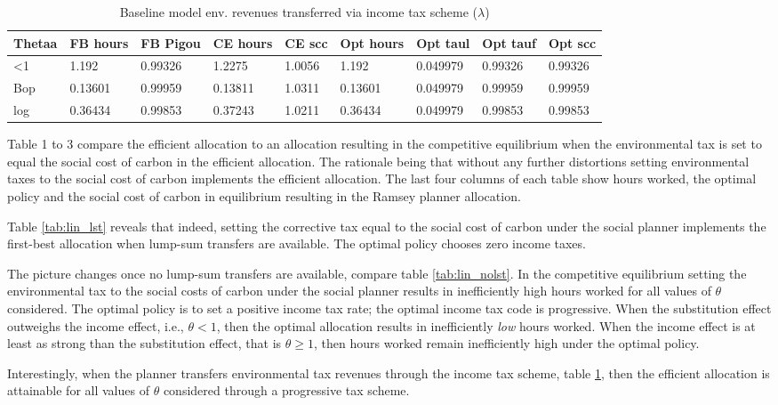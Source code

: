 \begin{table}[h!!]
	\caption{Baseline model env. revenues transferred via income tax scheme ($\lambda$)}\label{tab:base}
	\begin{tabular}{lllllllll}
		Thetaa & FB hours & FB Pigou & CE hours & CE scc & Opt hours & Opt taul & Opt tauf & Opt scc \\ 
		\hline 
		<1 & 1.192 & 0.99326 & 1.2275 & 1.0056 & 1.192 & 0.049979 & 0.99326 & 0.99326 \\ 
		Bop & 0.13601 & 0.99959 & 0.13811 & 1.0311 & 0.13601 & 0.049979 & 0.99959 & 0.99959 \\ 
		log & 0.36434 & 0.99853 & 0.37243 & 1.0211 & 0.36434 & 0.049979 & 0.99853 & 0.99853 \\ 
		\hline 
	\end{tabular}
\end{table}



Table 1 to 3 compare the efficient allocation to an allocation resulting in the competitive equilibrium when the environmental tax is set to equal the social cost of carbon in the efficient allocation. The rationale being that without any further distortions setting environmental taxes to the social cost of carbon implements the efficient allocation. The last four columns of each table show hours worked, the optimal policy and the social cost of carbon in equilibrium resulting in the Ramsey planner allocation. 

Table \ref{tab:lin_lst} reveals that indeed, setting the corrective tax equal to the social cost of carbon under the social planner implements the first-best allocation when lump-sum transfers are available. The optimal policy chooses zero income taxes. 

The picture changes once no lump-sum transfers are available, compare table \ref{tab:lin_nolst}. In the competitive equilibrium setting the environmental tax to the social costs of carbon under the social planner results in inefficiently high hours worked for all values of $\theta$ considered. The optimal policy is to set a positive income tax rate; the optimal income tax code is progressive. When the substitution effect outweighs the income effect, i.e., $\theta<1$, then the optimal allocation results in inefficiently \textit{low} hours worked. When the income effect is at least as strong than the substitution effect, that is $\theta\geq 1$, then hours worked remain inefficiently high under the optimal policy. 

Interestingly, when the planner transfers environmental tax revenues through the income tax scheme, table \ref{tab:base}, then the efficient allocation is attainable for all values of $\theta$ considered through a progressive tax scheme. 

